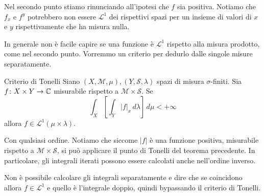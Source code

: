 \documentclass[a4paper]{article}
\begin{document}
\begin{radioactive}
Nel secondo punto stiamo rinunciando all'ipotesi che \(f\) sia positiva.
Notiamo che \(f_x\) e \(f^y\) potrebbero non essere \(\mathcal L^1\)
dei rispettivi spazi per un insieme di valori di \(x\) e \(y\)
rispettivamente che ha misura nulla.
\end{radioactive}

\begin{radioactive}
In generale non è facile capire se una funzione è \(\mathcal L^1\)
rispetto alla misura prodotto, come nel secondo punto. Vorremmo un criterio
per dedurlo dalle singole misure separatamente.
\end{radioactive}

\begin{radioactive}
\begin{snippettheorem}{Criterio di Tonelli}
    Siano \((X, \mathcal M, \mu), (Y, \mathcal S, \lambda)\)
    spazi di misura \(\sigma\)-finiti.
    Sia \(f \colon X \times Y \to \mathbb{C}\)
    misurabile rispetto a \(\mathcal M \times \mathcal S\). Se \[
        \int_X \left[
            \int_Y |f|_x \,d\lambda
        \right]\,d\mu < +\infty
    \]
    allora \(f \in \mathcal L^1(\mu \times \lambda)\).
\end{snippettheorem}
\end{radioactive}

\begin{radioactive}
Con qualsiasi ordine. Notiamo che siccome \(|f|\) è una funzione positiva,
misurabile rispetto a \(\mathcal M \times \mathcal S\),
si può applicare il punto di Tonelli del teorema precedente.
In particolare, gli integrali iterati possono essere calcolati anche nell'ordine
inverso.
\end{radioactive}

\begin{radioactive}
Non è possibile calcolare gli integrali separatamente e dire
che se coincidono allora \(f \in \mathcal L^1\) e quello è l'integrale doppio,
quindi bypassando il criterio di Tonelli.
\end{radioactive}

\pagebreak
\end{document}
